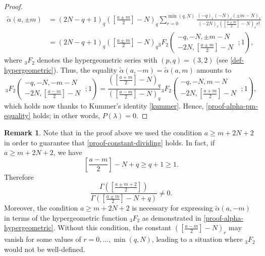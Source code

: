 \documentclass[12pt, pdflatex, a4paper]{article}
\theoremstyle{plain}
\theoremstyle{definition}
\newtheorem{rem}[thm]{Remark}
\begin{document}
\begin{proof}
\begin{equation}
\begin{aligned}
\widetilde{\alpha}(a, \pm m) &= (2N-q+1)_q \left(\left[\frac{a\pm m}{2}\right]-N\right)_q \sum_{r=0}^{\min(q,N)}\frac{(-q)_r(-N)_r( \pm m-N)_r}{(-2N)_r \left(\left[\frac{a\pm m}{2}\right]-N\right)_r r!}\\
& = (2N-q+1)_q \left(\left[\frac{a\pm m}{2}\right]-N\right)_q {}_3F_2\left(\begin{matrix}
-q, -N, \pm m -N\\
-2N, \left[\frac{a\pm m}{2}\right]-N
\end{matrix}\; ; 1\right),
\end{aligned}
\end{equation}
where ${}_3F_2$ denotes the hypergeometric series with $(p,q) = (3,2)$ (see \eqref{def-hypergeometric}). Thus, the equality $\widetilde{\alpha}(a, -m) = \widetilde{\alpha}(a, m)$ amounts to
\begin{equation*}
_3F_2\left(\begin{matrix}
-q, -N, -m -N\\
-2N, \left[\frac{a-m}{2}\right]-N
\end{matrix}\; ; 1\right) = \frac{\left(\left[\frac{a+ m}{2}\right]-N\right)_q}{\left(\left[\frac{a- m}{2}\right]-N\right)_q}{}_3F_2\left(\begin{matrix}
-q, -N, m -N\\
-2N, \left[\frac{a+ m}{2}\right]-N
\end{matrix}\; ; 1\right),
\end{equation*}
which holds now thanks to Kummer's identity \eqref{kummer}. Hence, \eqref{proof-alpha-pm-equality} holds; in other words, $P(\lambda) = 0$.
\end{proof}
\begin{rem} Note that in the proof above we used the condition $a \geq m+2N+2$ in order to guarantee that \eqref{proof-constant-dividing} holds. In fact, if $a \geq m+2N+2$, we have
\begin{equation*}
\left[\frac{a - m}{2}\right] -N +q \geq q+1 \geq 1.
\end{equation*}
Therefore
\begin{equation*}
\frac{\Gamma(\left[\frac{a\pm m+2}{2}\right])}{\Gamma(\left[\frac{a\pm m}{2}\right] -N + q)}  \neq 0.
\end{equation*}
Moreover, the condition $a \geq m+2N+2$ is necessary for expressing $\widetilde{\alpha}(a, -m)$ in terms of the hypergeometric function ${}_3F_2$ as demonstrated in \eqref{proof-alpha-hypergeometric}. Without this condition, the constant $\left(\left[\frac{a - m}{2}\right] -N\right)_r$ may vanish for some values of $r = 0, \ldots, \min(q,N)$, leading to a situation where ${}_3F_2$ would not be well-defined.
\end{rem}
\end{document}
